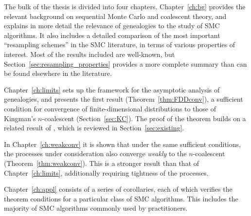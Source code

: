 The bulk of the thesis is divided into four chapters. 
Chapter~\ref{ch:bg} provides the relevant background on sequential Monte Carlo and coalescent theory, and explains in more detail the relevance of genealogies to the study of SMC algorithms.
It also includes a detailed comparison of the most important ``resampling schemes'' in the SMC literature, in terms of various properties of interest. Most of the results included are well-known, but Section~\ref{sec:resampling_properties} provides a more complete summary than can be found elsewhere in the literature.

Chapter~\ref{ch:limits} sets up the framework for the asymptotic analysis of genealogies, and presents the first result (Theorem~\ref{thm:FDDconv}), a sufficient condition for convergence of finite-dimensional distributions to those of Kingman's $n$-coalescent (Section~\ref{sec:KC}). The proof of the theorem builds on a related result of \textcite{koskela2018}, which is reviewed in Section~\ref{sec:existing}.

In Chapter~\ref{ch:weakconv} it is shown that under the same sufficient conditions, the processes under consideration also converge \emph{weakly} to the $n$-coalescent (Theorem~\ref{thm:weakconv}). This is a stronger result than that of Chapter~\ref{ch:limits}, additionally requiring tightness of the processes.

Chapter~\ref{ch:appl} consists of a series of corollaries, each of which verifies the theorem conditions for a particular class of SMC algorithms. This includes the majority of SMC algorithms commonly used by practitioners.

